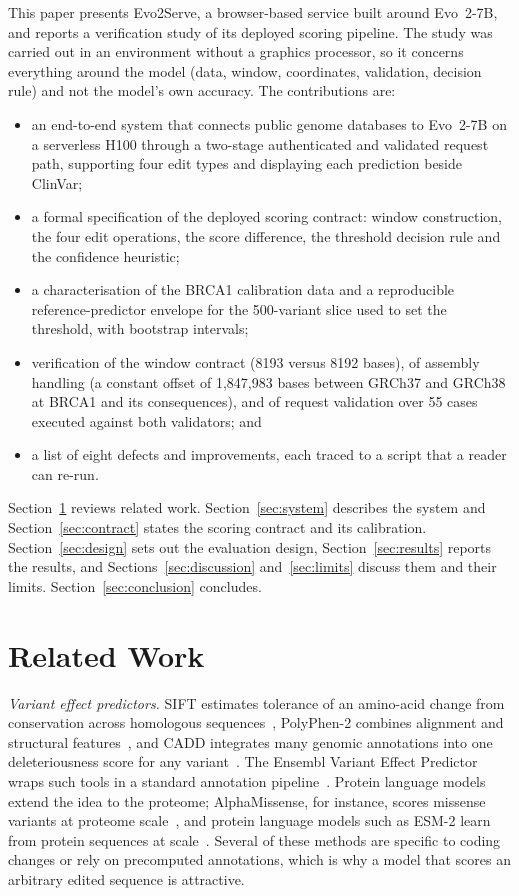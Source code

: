 \documentclass[10pt,journal,a4paper]{IEEEtran}
\begin{document}
This paper presents Evo2Serve, a browser-based service built around Evo~2-7B, and reports a verification study of its deployed scoring pipeline. The study was carried out in an environment without a graphics processor, so it concerns everything around the model (data, window, coordinates, validation, decision rule) and not the model's own accuracy. The contributions are:
\begin{itemize}
\item an end-to-end system that connects public genome databases to Evo~2-7B on a serverless H100 through a two-stage authenticated and validated request path, supporting four edit types and displaying each prediction beside ClinVar;
\item a formal specification of the deployed scoring contract: window construction, the four edit operations, the score difference, the threshold decision rule and the confidence heuristic;
\item a characterisation of the BRCA1 calibration data and a reproducible reference-predictor envelope for the 500-variant slice used to set the threshold, with bootstrap intervals;
\item verification of the window contract (8193 versus 8192 bases), of assembly handling (a constant offset of 1{,}847{,}983 bases between GRCh37 and GRCh38 at BRCA1 and its consequences), and of request validation over 55 cases executed against both validators; and
\item a list of eight defects and improvements, each traced to a script that a reader can re-run.
\end{itemize}

Section~\ref{sec:related} reviews related work. Section~\ref{sec:system} describes the system and Section~\ref{sec:contract} states the scoring contract and its calibration. Section~\ref{sec:design} sets out the evaluation design, Section~\ref{sec:results} reports the results, and Sections~\ref{sec:discussion} and~\ref{sec:limits} discuss them and their limits. Section~\ref{sec:conclusion} concludes.

\section{Related Work}
\label{sec:related}

\textit{Variant effect predictors.} SIFT estimates tolerance of an amino-acid change from conservation across homologous sequences~\cite{ng2001sift}, PolyPhen-2 combines alignment and structural features~\cite{adzhubei2010polyphen2}, and CADD integrates many genomic annotations into one deleteriousness score for any variant~\cite{rentzsch2019cadd}. The Ensembl Variant Effect Predictor wraps such tools in a standard annotation pipeline~\cite{mclaren2016vep}. Protein language models extend the idea to the proteome; AlphaMissense, for instance, scores missense variants at proteome scale~\cite{cheng2023alphamissense}, and protein language models such as ESM-2 learn from protein sequences at scale~\cite{lin2023esm2}. Several of these methods are specific to coding changes or rely on precomputed annotations, which is why a model that scores an arbitrary edited sequence is attractive.
\end{document}
